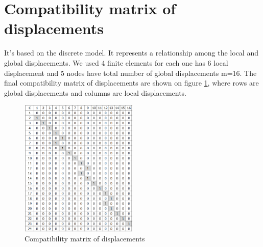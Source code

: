\section*{Compatibility matrix of displacements}
It's based on the discrete model. It represents a relationship among the local and global
displacements. We used 4 finite elements for each one has 6 local displacement and 5 nodes have
total number of global displacements m=16. The final compatibility matrix of displacements are shown
on figure \ref{fig:CDmatrix}, where rows are global displacements and columns are local
displacements.
\begin{figure}[H]
  \centering
  \includegraphics[width=0.5\textwidth]{./fig/CDmatrix.png}
    \caption{Compatibility matrix of displacements}
    \label{fig:CDmatrix}
\end{figure}
